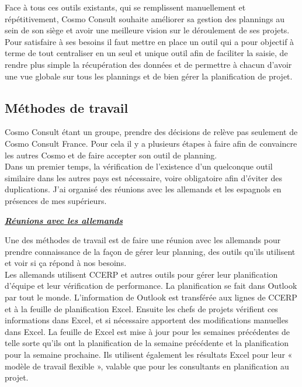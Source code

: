 \documentclass[11pt]{report}
\begin{document}
\hspace{1cm} Face à tous ces outils existants, qui se remplissent manuellement et répétitivement, Cosmo Consult souhaite améliorer sa gestion des plannings au sein de son siège et avoir une meilleure vision sur le déroulement de ses projets. \\

\hspace{1cm} Pour satisfaire à ses besoins il faut mettre en place un outil qui a pour objectif à terme de tout centraliser en un seul et unique outil afin de faciliter la saisie, de rendre plus simple la récupération des données et de permettre à chacun d’avoir une vue globale sur tous les plannings et de bien gérer la planification de projet.

	\subsection{Méthodes de travail}
\hspace{1cm} Cosmo Consult étant un groupe, prendre des décisions de relève pas seulement de Cosmo Consult France. Pour cela il y a plusieurs étapes à faire afin de convaincre les autres Cosmo et de faire accepter son outil de planning.\\

\hspace{1cm} Dans un premier temps, la vérification de l’existence d’un quelconque outil similaire dans les autres pays est nécessaire, voire obligatoire afin d’éviter des duplications.  J’ai organisé des réunions avec les allemands et les espagnols en présences de mes supérieurs.
\quad

\hspace{1cm} \underline{\textbf{\textit{Réunions avec les allemands}}}
\quad

\hspace{1cm} Une des méthodes de travail est de faire une réunion avec les allemands pour prendre connaissance de la façon de gérer leur planning, des outils qu’ils utilisent et voir si ça répond à nos besoins.\\

\hspace{1cm} Les allemands utilisent CCERP et autres outils pour gérer leur planification d'équipe et leur vérification de performance. La planification se fait dans Outlook par tout le monde. L’information de Outlook est transférée aux lignes de CCERP et à la feuille de planification Excel. Ensuite les chefs de projets vérifient ces informations dans Excel, et si nécessaire apportent des modifications manuelles dans Excel. La feuille de Excel est mise à jour pour les semaines précédentes de telle sorte qu’ils ont la planification de la semaine précédente et la planification pour la semaine prochaine. Ils utilisent également les résultats Excel pour leur « modèle de travail flexible », valable que pour les consultants en planification au projet.\\
\end{document}
